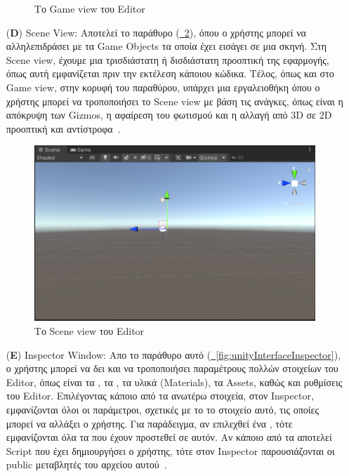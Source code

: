 \begin{itemize}
\begin{figure}[!ht]
        \caption{Το Game view του Editor}\label{fig:unityInterfaceGameView}
    \end{figure}
    \item[(\textbf{D})] Scene View: Αποτελεί το παράθυρο (\hyperref[fig:unityInterfaceSceneView]{\schema~\ref*{fig:unityInterfaceSceneView}}), όπου ο χρήστης μπορεί να αλληλεπιδράσει με τα Game Objects τα οποία έχει εισάγει σε μια σκηνή. Στη Scene view, έχουμε μια τρισδιάστατη ή δισδιάστατη προοπτική της εφαρμογής, όπως αυτή εμφανίζεται πριν την εκτέλεση κάποιου κώδικα. Τέλος, όπως και στο Game view, στην κορυφή του παραθύρου, υπάρχει μια εργαλειοθήκη όπου ο χρήστης μπορεί να τροποποιήσει το Scene view με βάση τις ανάγκες, όπως είναι η απόκρυψη των Gizmos, η αφαίρεση του φωτισμού και η αλλαγή από 3D σε 2D προοπτική και αντίστροφα~\cite{unitytechnologies_2023_scene}.
    \begin{figure}[!ht]
        \centering
        \includegraphics[width=0.9\linewidth]{images/unity_interface_scene_view.png}
        \caption{Το Scene view του Editor}\label{fig:unityInterfaceSceneView}
    \end{figure}
    \item[(\textbf{E})] Inspector Window: Απο το παράθυρο αυτό (\hyperref[fig:unityInterfaceInspector]{\schema~\ref*{fig:unityInterfaceInspector}}), ο χρήστης μπορεί να δει και να τροποποιήσει παραμέτρους πολλών στοιχείων του Editor, όπως είναι τα , τα , τα υλικά (Materials), τα Assets, καθώς και ρυθμίσεις του Editor. Επιλέγοντας κάποιο από τα ανωτέρω στοιχεία, στον Inspector, εμφανίζονται όλοι οι παράμετροι, σχετικές με το το στοιχείο αυτό, τις οποίες μπορεί να αλλάξει ο χρήστης. Για παράδειγμα, αν επιλεχθεί ένα , τότε εμφανίζονται όλα τα  που έχουν προστεθεί σε αυτόν. Αν κάποιο από τα  αποτελεί Script που έχει δημιουργήσει ο χρήστης, τότε στον Inspector παρουσιάζονται οι public μεταβλητές του αρχείου αυτού~\cite{unitytechnologies_2023_inspector}.

\end{itemize}

